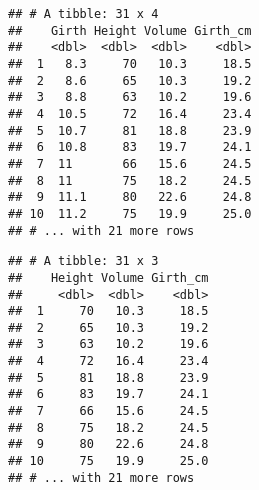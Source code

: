 \documentclass[]{article}
\newenvironment{Shaded}{\begin{snugshade}}{\end{snugshade}}
\newcommand{\DataTypeTok}[1]{\textcolor[rgb]{0.13,0.29,0.53}{#1}}
\newcommand{\DecValTok}[1]{\textcolor[rgb]{0.00,0.00,0.81}{#1}}
\newcommand{\FloatTok}[1]{\textcolor[rgb]{0.00,0.00,0.81}{#1}}
\newcommand{\KeywordTok}[1]{\textcolor[rgb]{0.13,0.29,0.53}{\textbf{#1}}}
\newcommand{\NormalTok}[1]{#1}
\newcommand{\OperatorTok}[1]{\textcolor[rgb]{0.81,0.36,0.00}{\textbf{#1}}}
\newcommand{\StringTok}[1]{\textcolor[rgb]{0.31,0.60,0.02}{#1}}
\begin{document}
\begin{verbatim}
## # A tibble: 31 x 4
##    Girth Height Volume Girth_cm
##    <dbl>  <dbl>  <dbl>    <dbl>
##  1   8.3     70   10.3     18.5
##  2   8.6     65   10.3     19.2
##  3   8.8     63   10.2     19.6
##  4  10.5     72   16.4     23.4
##  5  10.7     81   18.8     23.9
##  6  10.8     83   19.7     24.1
##  7  11       66   15.6     24.5
##  8  11       75   18.2     24.5
##  9  11.1     80   22.6     24.8
## 10  11.2     75   19.9     25.0
## # ... with 21 more rows
\end{verbatim}

\begin{Shaded}
\end{Shaded}

\begin{verbatim}
## # A tibble: 31 x 3
##    Height Volume Girth_cm
##     <dbl>  <dbl>    <dbl>
##  1     70   10.3     18.5
##  2     65   10.3     19.2
##  3     63   10.2     19.6
##  4     72   16.4     23.4
##  5     81   18.8     23.9
##  6     83   19.7     24.1
##  7     66   15.6     24.5
##  8     75   18.2     24.5
##  9     80   22.6     24.8
## 10     75   19.9     25.0
## # ... with 21 more rows
\end{verbatim}

\begin{Shaded}
\end{Shaded}
\end{document}
